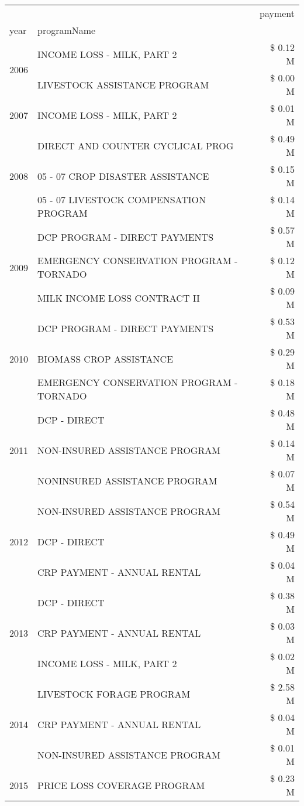 \begin{tabular}{llr}
\toprule
 &  & payment \\
year & programName &  \\
\midrule
\multirow[t]{2}{*}{2006} & INCOME LOSS - MILK, PART 2 & \$ 0.12 M \\
 & LIVESTOCK ASSISTANCE PROGRAM & \$ 0.00 M \\
\cline{1-3}
2007 & INCOME LOSS - MILK, PART 2 & \$ 0.01 M \\
\cline{1-3}
\multirow[t]{3}{*}{2008} & DIRECT AND COUNTER CYCLICAL PROG & \$ 0.49 M \\
 & 05 - 07 CROP DISASTER ASSISTANCE & \$ 0.15 M \\
 & 05 - 07 LIVESTOCK COMPENSATION PROGRAM & \$ 0.14 M \\
\cline{1-3}
\multirow[t]{3}{*}{2009} & DCP PROGRAM - DIRECT PAYMENTS & \$ 0.57 M \\
 & EMERGENCY CONSERVATION PROGRAM - TORNADO & \$ 0.12 M \\
 & MILK INCOME LOSS CONTRACT II & \$ 0.09 M \\
\cline{1-3}
\multirow[t]{3}{*}{2010} & DCP PROGRAM - DIRECT PAYMENTS & \$ 0.53 M \\
 & BIOMASS CROP ASSISTANCE & \$ 0.29 M \\
 & EMERGENCY CONSERVATION PROGRAM - TORNADO & \$ 0.18 M \\
\cline{1-3}
\multirow[t]{3}{*}{2011} & DCP - DIRECT & \$ 0.48 M \\
 & NON-INSURED ASSISTANCE PROGRAM & \$ 0.14 M \\
 & NONINSURED ASSISTANCE PROGRAM & \$ 0.07 M \\
\cline{1-3}
\multirow[t]{3}{*}{2012} & NON-INSURED ASSISTANCE PROGRAM & \$ 0.54 M \\
 & DCP - DIRECT & \$ 0.49 M \\
 & CRP PAYMENT - ANNUAL RENTAL & \$ 0.04 M \\
\cline{1-3}
\multirow[t]{3}{*}{2013} & DCP - DIRECT & \$ 0.38 M \\
 & CRP PAYMENT - ANNUAL RENTAL & \$ 0.03 M \\
 & INCOME LOSS - MILK, PART 2 & \$ 0.02 M \\
\cline{1-3}
\multirow[t]{3}{*}{2014} & LIVESTOCK FORAGE PROGRAM & \$ 2.58 M \\
 & CRP PAYMENT - ANNUAL RENTAL & \$ 0.04 M \\
 & NON-INSURED ASSISTANCE PROGRAM & \$ 0.01 M \\
\cline{1-3}
\multirow[t]{3}{*}{2015} & PRICE LOSS COVERAGE PROGRAM & \$ 0.23 M \\

\end{tabular}
